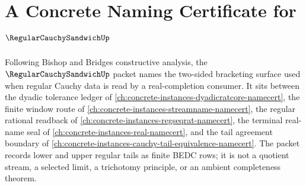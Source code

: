 \chapter{A Concrete Naming Certificate for $\RegularCauchySandwichUp$}
\label{ch:concrete-instances-regular-cauchy-sandwich-namecert}

Following Bishop and Bridges constructive analysis, the $\RegularCauchySandwichUp$ packet names the two-sided bracketing surface used when regular Cauchy data is read by a real-completion consumer. It sits between the dyadic tolerance ledger of \autoref{ch:concrete-instances-dyadicratcore-namecert}, the finite window route of \autoref{ch:concrete-instances-streamname-namecert}, the regular rational readback of \autoref{ch:concrete-instances-regseqrat-namecert}, the terminal real-name seal of \autoref{ch:concrete-instances-real-namecert}, and the tail agreement boundary of \autoref{ch:concrete-instances-cauchy-tail-equivalence-namecert}. The packet records lower and upper regular tails as finite BEDC rows; it is not a quotient stream, a selected limit, a trichotomy principle, or an ambient completeness theorem.

